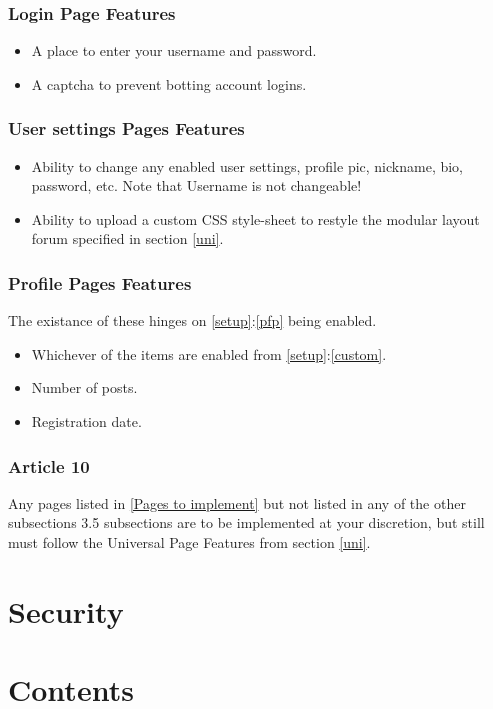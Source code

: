 \documentclass[]{article}
\begin{document}
\subsubsection{Login Page Features}
\begin{itemize}
    \item A place to enter your username and password.
    \item A captcha to prevent botting account logins.
\end{itemize}

\subsubsection{User settings Pages Features}
\begin{itemize}
    \item Ability to change any enabled user settings, profile pic, nickname, bio, password, etc. Note that Username is not changeable!
    \item Ability to upload a custom CSS style-sheet to restyle the modular layout forum specified in section \ref{uni}.
\end{itemize}


\subsubsection{Profile Pages Features}
The existance of these hinges on \ref{setup}:\ref{pfp} being enabled.
\begin{itemize}
    \item Whichever of the items are enabled from \ref{setup}:\ref{custom}.
    \item Number of posts.
    \item Registration date.
\end{itemize}

\subsubsection{Article 10}
Any pages listed in \ref{Pages to implement} but not listed in any of the other subsections 3.5 subsections are to be implemented at your discretion, but still must follow the Universal Page Features from section \ref{uni}.

\section{Security}

\newpage
\section{Contents}\label{cont}
\tableofcontents
\end{document}
